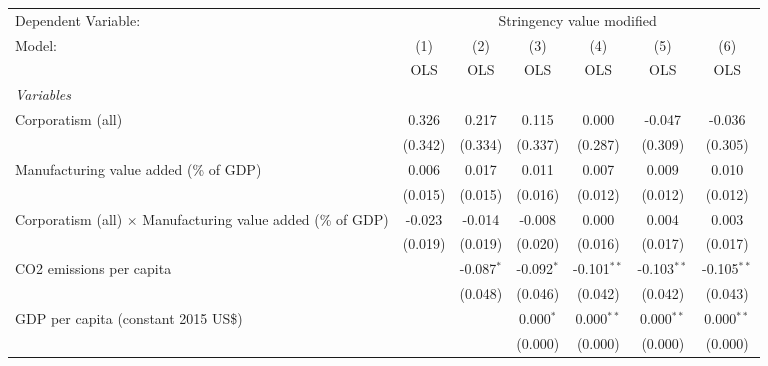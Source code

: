 
\begingroup
\centering
\begin{tabular}{lcccccc}
   \toprule
   Dependent Variable: & \multicolumn{6}{c}{Stringency value modified}\\
   Model:                                                             & (1)     & (2)          & (3)          & (4)           & (5)           & (6)\\  
                                                                      &  OLS    & OLS          & OLS          & OLS           & OLS           & OLS\\  
   \midrule
   \emph{Variables}\\
   Corporatism (all)                                                  & 0.326   & 0.217        & 0.115        & 0.000         & -0.047        & -0.036\\   
                                                                      & (0.342) & (0.334)      & (0.337)      & (0.287)       & (0.309)       & (0.305)\\   
   Manufacturing value added (\% of GDP)                              & 0.006   & 0.017        & 0.011        & 0.007         & 0.009         & 0.010\\   
                                                                      & (0.015) & (0.015)      & (0.016)      & (0.012)       & (0.012)       & (0.012)\\   
   Corporatism (all) $\times$ Manufacturing value added (\% of GDP)   & -0.023  & -0.014       & -0.008       & 0.000         & 0.004         & 0.003\\   
                                                                      & (0.019) & (0.019)      & (0.020)      & (0.016)       & (0.017)       & (0.017)\\   
   CO2 emissions per capita                                           &         & -0.087$^{*}$ & -0.092$^{*}$ & -0.101$^{**}$ & -0.103$^{**}$ & -0.105$^{**}$\\   
                                                                      &         & (0.048)      & (0.046)      & (0.042)       & (0.042)       & (0.043)\\   
   GDP per capita (constant 2015 US\$)                                &         &              & 0.000$^{*}$  & 0.000$^{**}$  & 0.000$^{**}$  & 0.000$^{**}$\\   
                                                                      &         &              & (0.000)      & (0.000)       & (0.000)       & (0.000)\\   

\end{tabular}
